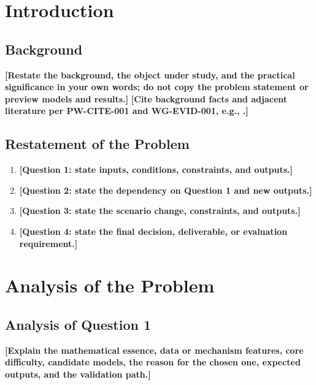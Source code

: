 \documentclass[12pt,letterpaper]{article}
\newcommand{\TemplateField}[1]{\textbf{[#1]}}
\begin{document}
\clearpage

\renewcommand\contentsname{Contents}
\tableofcontents
\clearpage

\section{Introduction}
\label{text:counted-first}

\subsection{Background}
\TemplateField{Restate the background, the object under study, and the practical significance in your own words; do not copy the problem statement or preview models and results.}
\TemplateField{Cite background facts and adjacent literature per PW-CITE-001 and WG-EVID-001, e.g., \cite{topic-ref-1,topic-ref-2}.}

\subsection{Restatement of the Problem}
\begin{enumerate}[label=\arabic*.]
  \item \TemplateField{Question 1: state inputs, conditions, constraints, and outputs.}
  \item \TemplateField{Question 2: state the dependency on Question 1 and new outputs.}
  \item \TemplateField{Question 3: state the scenario change, constraints, and outputs.}
  \item \TemplateField{Question 4: state the final decision, deliverable, or evaluation requirement.}
\end{enumerate}

\section{Analysis of the Problem}

\subsection{Analysis of Question 1}
\TemplateField{Explain the mathematical essence, data or mechanism features, core difficulty, candidate models, the reason for the chosen one, expected outputs, and the validation path.}
\end{document}
